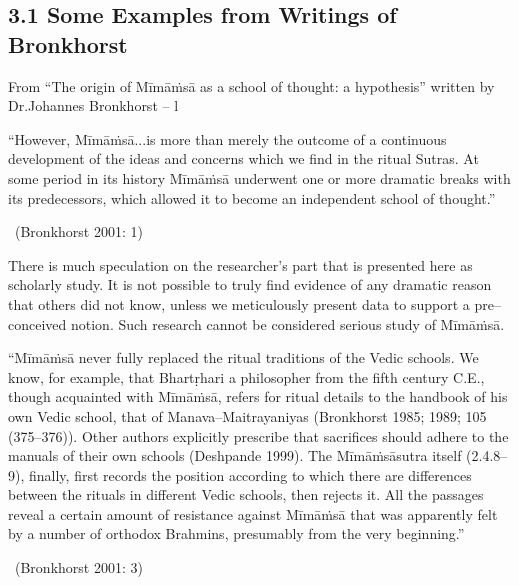 \subsection*{3.1 Some Examples from Writings of Bronkhorst}

From “The origin of Mīmāṁsā as a school of thought: a hypothesis” written by Dr.Johannes Bronkhorst – l

\begin{myquote}
“However, Mīmāṁsā...is more than merely the outcome of a continuous development of the ideas and concerns which we find in the ritual Sutras. At some period in its history Mīmāṁsā underwent one or more dramatic breaks with its predecessors, which allowed it to become an independent school of thought.” 

~\hfill (Bronkhorst 2001: 1)
\end{myquote}

There is much speculation on the researcher’s part that is presented here as scholarly study. It is not possible to truly find evidence of any dramatic reason that others did not know, unless we meticulously present data to support a pre–conceived notion. Such research cannot be considered serious study of Mīmāṁsā.

\begin{myquote}
“Mīmāṁsā never fully replaced the ritual traditions of the Vedic schools. We know, for example, that Bhartṛhari a philosopher from the fifth century C.E., though acquainted with Mīmāṁsā, refers for ritual details to the handbook of his own Vedic school, that of Manava–Maitrayaniyas (Bronkhorst 1985; 1989; 105 (375–376)). Other authors explicitly prescribe that sacrifices should adhere to the manuals of their own schools (Deshpande 1999). The Mīmāṁsāsutra itself (2.4.8–9), finally, first records the position according to which there are differences between the rituals in different Vedic schools, then rejects it. All the passages reveal a certain amount of resistance against Mīmāṁsā that was apparently felt by a number of orthodox Brahmins, presumably from the very beginning.” 

~\hfill (Bronkhorst 2001: 3)
\end{myquote}

